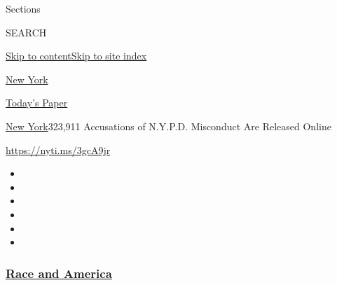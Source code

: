 Sections

SEARCH

\protect\hyperlink{site-content}{Skip to
content}\protect\hyperlink{site-index}{Skip to site index}

\href{https://www.nytimes3xbfgragh.onion/section/nyregion}{New York}

\href{https://myaccount.nytimes3xbfgragh.onion/auth/login?response_type=cookie\&client_id=vi}{}

\href{https://www.nytimes3xbfgragh.onion/section/todayspaper}{Today's
Paper}

\href{/section/nyregion}{New York}\textbar{}323,911 Accusations of
N.Y.P.D. Misconduct Are Released Online

\url{https://nyti.ms/3gcA9jr}

\begin{itemize}
\item
\item
\item
\item
\item
\item
\end{itemize}

\hypertarget{race-and-america}{%
\subsubsection{\texorpdfstring{\href{https://www.nytimes3xbfgragh.onion/news-event/george-floyd-protests-minneapolis-new-york-los-angeles?name=styln-george-floyd\&region=TOP_BANNER\&variant=undefined\&block=storyline_menu_recirc\&action=click\&pgtype=Article\&impression_id=b3286630-e38b-11ea-b524-5975769cbb40}{Race
and America}}{Race and America}}\label{race-and-america}}

